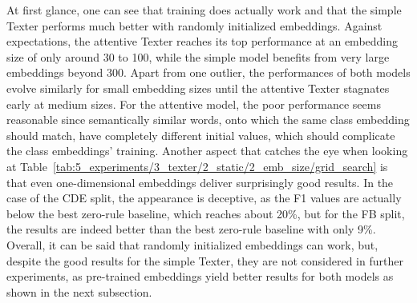 At first glance, one can see that training does actually work and that the simple Texter performs much better with randomly initialized embeddings. Against expectations, the attentive Texter reaches its top performance at an embedding size of only around 30 to 100, while the simple model benefits from very large embeddings beyond 300. Apart from one outlier, the performances of both models evolve similarly for small embedding sizes until the attentive Texter stagnates early at medium sizes. For the attentive model, the poor performance seems reasonable since semantically similar words, onto which the same class embedding should match, have completely different initial values, which should complicate the class embeddings' training. Another aspect that catches the eye when looking at Table~\ref{tab:5_experiments/3_texter/2_static/2_emb_size/grid_search} is that even one-dimensional embeddings deliver surprisingly good results. In the case of the CDE split, the appearance is deceptive, as the F1 values are actually below the best zero-rule baseline, which reaches about 20\%, but for the FB split, the results are indeed better than the best zero-rule baseline with only 9\%. Overall, it can be said that randomly initialized embeddings can work, but, despite the good results for the simple Texter, they are not considered in further experiments, as pre-trained embeddings yield better results for both models as shown in the next subsection.
